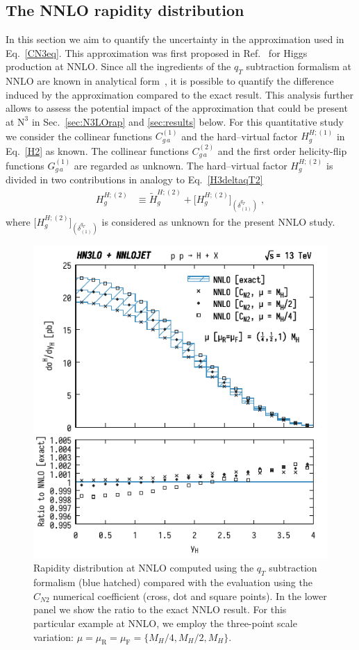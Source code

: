 \documentclass[12pt]{article}
\DeclareRobustCommand{\mur}{\ensuremath{\mu_{\mathrm{R}}}\xspace}
\DeclareRobustCommand{\muR}{\mur}
\DeclareRobustCommand{\muf}{\ensuremath{\mu_{\mathrm{F}}}\xspace}
\DeclareRobustCommand{\muF}{\muf}
\DeclareRobustCommand{\qt}{\ensuremath{q_T}\xspace}
\DeclareRobustCommand{\LO}{\text{LO}\xspace}
\DeclareRobustCommand{\N}[1]{\ensuremath{\text{N}^{#1}}} %
\begin{document}
\subsection{The NNLO rapidity distribution}
\label{sec:NNLOrap}

In this section we aim to quantify the uncertainty in the approximation used in Eq.~\eqref{CN3eq}. This approximation was first proposed in Ref.~\cite{Bozzi:2005wk} for Higgs production at NNLO. Since all the ingredients of the $\qt$ subtraction formalism at NNLO are known in analytical form~\cite{Catani:2011kr}, it is possible to quantify the difference induced by the approximation compared to the exact result. This analysis further allows to assess the potential impact of the approximation that could be present at \N3\LO in Sec.~\ref{sec:N3LOrap} and \ref{sec:results} below. For this quantitative study we consider the collinear functions $C^{(1)}_{g\,a}$ and the hard--virtual factor $H^{H;(1)}_g$ in Eq.~\eqref{H2} as known. The collinear functions $C^{(2)}_{g\,a}$ and the first order helicity-flip functions $G^{(1)}_{g\,a}$ are regarded as unknown. The hard--virtual factor $H^{H;(2)}_g$ is divided in two contributions in analogy to Eq.~\eqref{H3deltaqT2}
\begin{align}
  H^{H;(2)}_g  
  &\equiv  
  \widetilde{H}^{H;(2)}_{g} + \big[H^{H;(2)}_{g}\big]_{(\delta^{\qt}_{(1)})} \;,
\end{align}
where $\big[H^{H;(2)}_{g}\big]_{(\delta^{\qt}_{(1)})}$ is considered as unknown for the present NNLO study. 

\begin{figure}[t]
\centering
\includegraphics[width=.6\linewidth]{./new_figures/yH_B02_CN}
\caption{\label{fig:yHCN}{Rapidity distribution at NNLO computed using the $\qt$ subtraction formalism (blue hatched) compared with the evaluation using the $C_{N2}$ numerical coefficient (cross, dot and square points). In the lower panel we show the ratio to the exact NNLO result. For this particular example at NNLO, we employ the three-point scale variation: $\mu=\muR=\muF=\{M_{H}/4,M_{H}/2,M_{H}\}$. 
}}
\end{figure}
\end{document}
